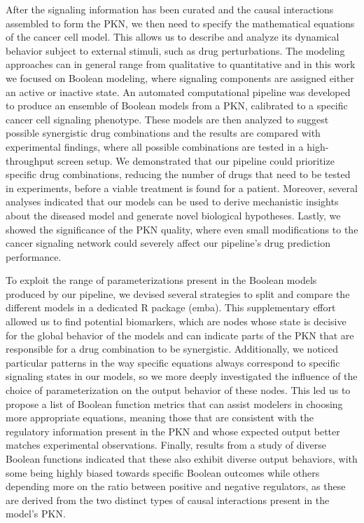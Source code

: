 \documentclass[
  12pt,
]{book}
\begin{document}
After the signaling information has been curated and the causal interactions assembled to form the PKN, we then need to specify the mathematical equations of the cancer cell model.
This allows us to describe and analyze its dynamical behavior subject to external stimuli, such as drug perturbations.
The modeling approaches can in general range from qualitative to quantitative and in this work we focused on Boolean modeling, where signaling components are assigned either an active or inactive state.
An automated computational pipeline was developed to produce an ensemble of Boolean models from a PKN, calibrated to a specific cancer cell signaling phenotype.
These models are then analyzed to suggest possible synergistic drug combinations and the results are compared with experimental findings, where all possible combinations are tested in a high-throughput screen setup.
We demonstrated that our pipeline could prioritize specific drug combinations, reducing the number of drugs that need to be tested in experiments, before a viable treatment is found for a patient.
Moreover, several analyses indicated that our models can be used to derive mechanistic insights about the diseased model and generate novel biological hypotheses.
Lastly, we showed the significance of the PKN quality, where even small modifications to the cancer signaling network could severely affect our pipeline's drug prediction performance.

\newpage

To exploit the range of parameterizations present in the Boolean models produced by our pipeline, we devised several strategies to split and compare the different models in a dedicated R package (emba).
This supplementary effort allowed us to find potential biomarkers, which are nodes whose state is decisive for the global behavior of the models and can indicate parts of the PKN that are responsible for a drug combination to be synergistic.
Additionally, we noticed particular patterns in the way specific equations always correspond to specific signaling states in our models, so we more deeply investigated the influence of the choice of parameterization on the output behavior of these nodes.
This led us to propose a list of Boolean function metrics that can assist modelers in choosing more appropriate equations, meaning those that are consistent with the regulatory information present in the PKN and whose expected output better matches experimental observations.
Finally, results from a study of diverse Boolean functions indicated that these also exhibit diverse output behaviors, with some being highly biased towards specific Boolean outcomes while others depending more on the ratio between positive and negative regulators, as these are derived from the two distinct types of causal interactions present in the model's PKN.
\end{document}
